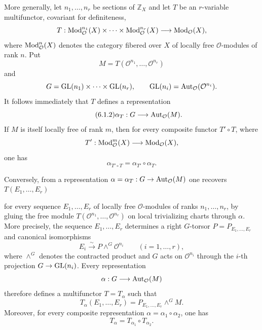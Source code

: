 More generally, let $n_1,\ldots,n_r$ be sections of $\mathbb Z_X$ and let
$T$ be an $r$-variable multifunctor, covariant for definiteness,
\[
T:\operatorname{Mod}_{\mathcal O}^{n_1}(X)\times\cdots\times
\operatorname{Mod}_{\mathcal O}^{n_r}(X)\longrightarrow\operatorname{Mod}_{\mathcal O}(X),
\]
where $\operatorname{Mod}_{\mathcal O}^n(X)$ denotes the category fibered over $X$ of
locally free $\mathcal O$-modules of rank $n$. Put
\[
M=T(\mathcal O^{n_1},\ldots,\mathcal O^{n_r})
\]
and
\[
G=\operatorname{GL}(n_1)\times\cdots\times\operatorname{GL}(n_r),
\qquad
\operatorname{GL}(n_i)=\operatorname{Aut}_{\mathcal O}(\mathcal O^{n_i}).
\]
It follows immediately that $T$ defines a representation
\begin{equation}\tag{6.1.2}
\alpha_T:G\longrightarrow\operatorname{Aut}_{\mathcal O}(M).
\end{equation}
If $M$ is itself locally free of rank $m$, then for every composite functor
$T'\circ T$, where
\[
T':\operatorname{Mod}_{\mathcal O}^m(X)\longrightarrow\operatorname{Mod}_{\mathcal O}(X),
\]
one has
\begin{equation}\tag{6.1.3}
\alpha_{T'\circ T}=\alpha_{T'}\circ\alpha_T.
\end{equation}

Conversely, from a representation
$\alpha=\alpha_T:G\to\operatorname{Aut}_{\mathcal O}(M)$ one recovers
$T(E_1,\ldots,E_r)$

for every sequence $E_1,\ldots,E_r$ of locally free $\mathcal O$-modules of
ranks $n_1,\ldots,n_r$, by gluing the free module
$T(\mathcal O^{n_1},\ldots,\mathcal O^{n_r})$ on local trivializing charts
through $\alpha$. More precisely, the sequence $E_1,\ldots,E_r$ determines a
right $G$-torsor $P=P_{E_1,\ldots,E_r}$ and canonical isomorphisms
\begin{equation}\tag{6.1.3}
E_i\xrightarrow{\sim}P\mathbin{\wedge^G}\mathcal O^{n_i}
\qquad(i=1,\ldots,r),
\end{equation}
where $\wedge^G$ denotes the contracted product and $G$ acts on
$\mathcal O^{n_i}$ through the $i$-th projection $G\to\operatorname{GL}(n_i)$. Every
representation
\[
\alpha:G\longrightarrow\operatorname{Aut}_{\mathcal O}(M)
\]
therefore defines a multifunctor $T=T_\alpha$ such that
\begin{equation}\tag{6.1.4}
T_\alpha(E_1,\ldots,E_r)
=P_{E_1,\ldots,E_r}\mathbin{\wedge^G}M.
\end{equation}
Moreover, for every composite representation
$\alpha=\alpha_1\circ\alpha_2$, one has
\begin{equation}\tag{6.1.5}
T_\alpha=T_{\alpha_1}\circ T_{\alpha_2}.
\end{equation}

